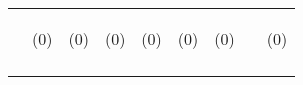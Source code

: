 \begin{tabular}{lcccccccc}
 & \begin{footnotesize}(0)\end{footnotesize} & \begin{footnotesize}(0)\end{footnotesize} & \begin{footnotesize}(0)\end{footnotesize} & \begin{footnotesize}(0)\end{footnotesize} & \begin{footnotesize}(0)\end{footnotesize} & \begin{footnotesize}(0)\end{footnotesize} & \begin{footnotesize}\end{footnotesize} & \begin{footnotesize}(0)\end{footnotesize}\\
\noalign{\smallskip}\hline\end{tabular}\\
